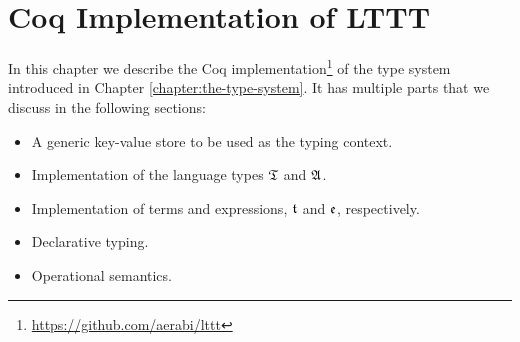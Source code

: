 \chapter{Coq Implementation of LTTT}\label{chap:coq-implementation}

In this chapter we describe the Coq implementation\footnote{\url{https://github.com/aerabi/lttt}} of the type system introduced in Chapter \ref{chapter:the-type-system}. It has multiple parts that we discuss in the following sections:
\begin{itemize}
    \item A generic key-value store to be used as the typing context.
    \item Implementation of the language types $\mathfrak{T}$ and $\mathfrak{A}$.
    \item Implementation of terms and expressions, $\mathfrak{t}$ and $\mathfrak{e}$, respectively.
    \item Declarative typing.
    \item Operational semantics.
\end{itemize}



